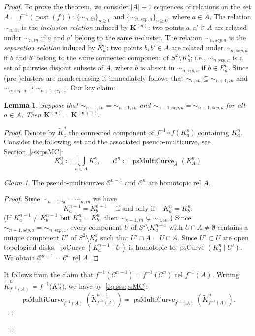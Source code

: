 \documentclass{amsart}
\theoremstyle{plain}
\newtheorem{lemma}[theorem]{Lemma}
\theoremstyle{definition}
\theoremstyle{remark}
\newtheorem*{claim}{Claim}
\renewcommand{\sp}{{\ \ }}
\newcommand{\post}{\operatorname{post}}
\newcommand{\CC}{{\mathcal C}}
\newcommand{\psMC}{{\operatorname{psMultiCurve}}}
\newcommand{\psCurve}{{\operatorname{psCurve}}}
\begin{document}
\begin{proof}
To prove the theorem, we consider $|A|+1$ sequences of relations on the set $A=f^{-1}(\post(f))$: $\{\sim_{n,in}\}_{n\geq 0}$ and $\{\sim_{n,sep,a}\}_{n\geq 0}$, where $a\in A$. The relation $\sim_{n,in}$ is the \emph{inclusion relation} induced by $\mathbf{K}^{(n)}$: two points $a,a'\in A$ are related under $\sim_{n,in}$ if $a$ and $a'$ belong to the same $n$-cluster.  The relation $\sim_{n,sep,a}$ is the \emph{separation relation} induced by $K^n_a$: two points $b,b'\in A$ are related under $\sim_{n,sep,a}$ if $b$ and $b'$ belong to the same connected component of $S^2\setminus K_a^n$; i.e., $\sim_{n,sep,a}$ is a set of pairwise disjoint subsets of $A$, where $b$ is absent in $\sim_{n,sep,a}$ if $b\in K^n_a$. Since (pre-)clusters are nondecreasing it immediately follows that $\sim_{n,in}\subseteq \sim_{n+1,in}$ and $\sim_{n,sep,a} \supseteq \sim_{n+1,sep,a}$. Our key claim:

\begin{lemma}
\label{lem: eq_relation_strict}
Suppose that $\sim_{n-1,in} = \sim_{n+1,in}$ and $\sim_{n-1,sep,a} = \sim_{n+1,sep,a}$ for all $a\in A$. Then $\mathbf {K^{(n)}}=\mathbf {K^{(n+1)}}$.
\end{lemma}
\begin{proof}
Denote by $\widetilde K^n_a$ the connected component of $f^{-1}\circ f (K^n_a)$ containing $K^n_a$. Consider the following set and the associated pseudo-multicurve, see Section~\ref{sss:psMC}: 
\[ K^n_A \coloneq \bigcup_{a\in A} K^n_a,\sp \sp\sp \sp \CC^n\coloneq \psMC_A\left( K^n_A\right)\] 


\begin{claim}
The pseudo-multicurves $\CC^{n-1}$ and $\CC^n$ are homotopic rel $A$. 
\end{claim}
\begin{proof}
 Since $\sim_{n-1,in} = \sim_{n,in}$ we have 
 \[ K^{n-1}_a= K^{n-1}_b\sp\sp\text{ if and only if }\sp\sp  K^n_a= K^n_b.\]
 (If $K^{n-1}_a\not= K^{n-1}_b$ but $K^n_a= K^n_b$, then $\sim_{n-1,in} \subsetneq \sim_{n,in}$.) Since $\sim_{n-1,sep,a} = \sim_{n,sep,a}$, every component $U$ of $S^2\setminus K^{n-1}_a$ with $U\cap A\not=\emptyset$ contains a unique component $U'$ of $S^2\setminus K^n_a$ such that $U'\cap A=U\cap A$. Since $U'\subset U$ are open topological disks, $\psCurve( K^{n-1}_a\mid U)$ is homotopic to $\psCurve( K^n_a\mid U')$. We obtain $\CC^{n-1}=\CC^n$ rel $A$.
\end{proof}

It follows from the claim that $f^{-1}(\CC^{n-1})=f^{-1}(\CC^n)$ rel $f^{-1}(A)$. Writing $ \widetilde K^n_{f^{-1}(A)} \coloneq f^{-1}\big(K^n_A\big)$, we have by~\eqref{eq:sss:psMC}: 
\begin{equation}
\label{eq:prf:main claim}
\psMC_{f^{-1}(A)}\left(\widetilde K^{n-1}_{f^{-1}(A)}\right)=\psMC_{f^{-1}(A)}\left(\widetilde K^n_{f^{-1}(A)}\right).
\end{equation}



\end{proof}
\end{proof}
\end{document}
